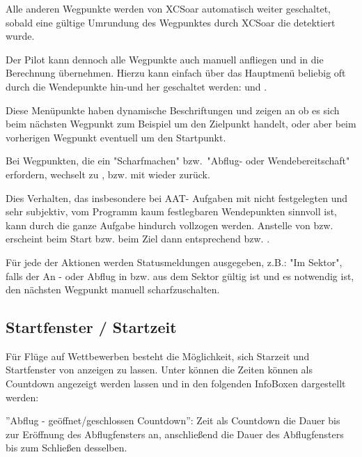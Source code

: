 Alle anderen Wegpunkte werden von \textsf{XCSoar} automatisch weiter geschaltet, sobald eine gültige Umrundung  des Wegpunktes durch \textsf{XCSoar} die detektiert wurde.

Der Pilot kann dennoch alle Wegpunkte auch manuell anfliegen und in die Berechnung übernehmen. Hierzu kann einfach über das Hauptmenü beliebig oft durch die Wendepunkte hin-und her geschaltet werden:
\blink{} und
\blink{}.  

Diese Menüpunkte haben dynamische Beschriftungen und zeigen an ob es sich beim nächsten Wegpunkt zum Beispiel um den Zielpunkt handelt, oder aber beim vorherigen Wegpunkt eventuell um den Startpunkt.

Bei Wegpunkten, die ein "Scharfmachen"  bzw.\ "Abflug- oder Wendebereitschaft" erfordern, wechselt \blink{} zu , bzw. mit  wieder zurück.

Dies Verhalten, das insbesondere bei AAT- Aufgaben mit nicht festgelegten und sehr subjektiv, vom Programm kaum festlegbaren Wendepunkten sinnvoll ist, kann durch die ganze Aufgabe hindurch vollzogen werden. Anstelle von  bzw.  erscheint beim Start bzw. beim Ziel dann entsprechend  bzw. .

Für jede der Aktionen  werden Statusmeldungen ausgegeben, z.B.: "Im Sektor", falls der An - oder Abflug in bzw. aus dem Sektor gültig ist und es notwendig ist, den nächsten Wegpunkt manuell scharfzuschalten.



\subsection*{Startfenster / Startzeit}\label{sec:start-gate}
Für Flüge auf Wettbewerben besteht die Möglichkeit, sich Starzeit und Startfenster von \xc anzeigen zu lassen. 
Unter {} können die Zeiten können als Countdown angezeigt werden lassen und in den folgenden InfoBoxen dargestellt werden:

''Abflug - geöffnet/geschlossen Countdown'': 
Zeit als Countdown die  Dauer bis zur Eröffnung des Abflugfensters an, anschließend die Dauer des Abflugfensters bis zum Schließen desselben. 


